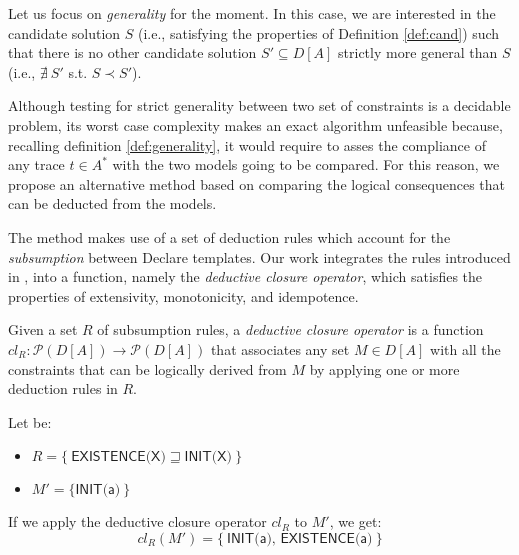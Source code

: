 
Let us focus on \emph{generality} for the moment. In this case, we are interested in the candidate solution $S$ (i.e., satisfying the properties of Definition \ref{def:cand}) such that there is no other candidate solution $S'\subseteq D[A]$  strictly more general than $S$ (i.e., $\nexists~ S'$ s.t. $S\prec S'$).


Although testing for strict generality between two set of constraints is a decidable problem, its worst case complexity makes an exact algorithm unfeasible because, recalling definition \ref{def:generality}, it would require to asses the compliance of any trace $t \in A^*$ with the two models going to be compared.
For this reason, we propose an alternative method based on comparing the logical consequences that can be deducted from the models.

The method makes use of a set of deduction rules which account for the \emph{subsumption} between Declare templates. Our work integrates the rules introduced in \cite{2017-DiCiccio}, into a function, namely the \emph{deductive closure operator}, which satisfies the properties of extensivity, monotonicity, and idempotence.


\theoremstyle{definition}\label{def:closure}
\begin{definition}{}
Given a set $R$ of subsumption rules, a \emph{deductive closure operator} is a function $cl_R: \mathcal{P}(D[A])\rightarrow\mathcal{P}(D[A])$ that associates any set $M \in D[A]$ with all the constraints that can be logically derived from $M$ by applying one or more deduction rules in $R$.
\end{definition}

\begin{example}
Let be:
\begin{itemize}
\item $R=\{\ \textsf{EXISTENCE(X)} \sqsupseteq \textsf{INIT(X)}\ \}$
\item $M'=\{ \textsf{INIT(a)}\ \}$
\end{itemize}
If we apply the deductive closure operator $cl_R$ to $M'$, we get:
$$
cl_R(M') = \{\ \textsf{INIT(a), EXISTENCE(a)}\ \}
$$
\end{example}

